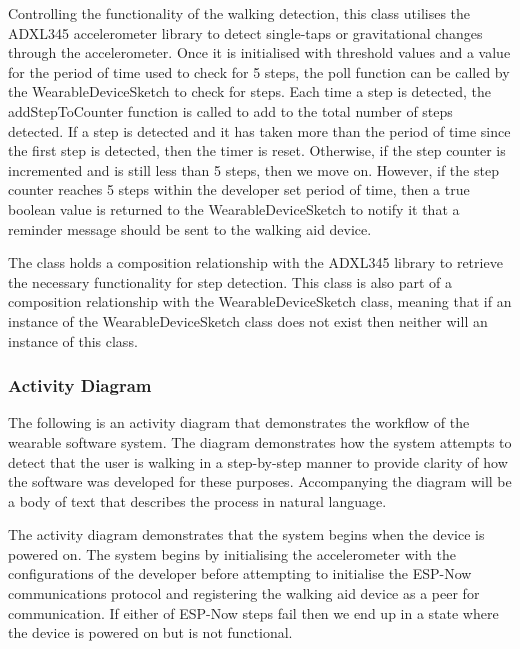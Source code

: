                     Controlling the functionality of the walking detection, this class utilises the ADXL345 accelerometer library to detect single-taps or gravitational changes through the accelerometer. Once it is initialised with threshold values and a value for the period of time used to check for 5 steps, the poll function can be called by the WearableDeviceSketch to check for steps. Each time a step is detected, the addStepToCounter function is called to add to the total number of steps detected. If a step is detected and it has taken more than the period of time since the first step is detected, then the timer is reset. Otherwise, if the step counter is incremented and is still less than 5 steps, then we move on. However, if the step counter reaches 5 steps within the developer set period of time, then a true boolean value is returned to the WearableDeviceSketch to notify it that a reminder message should be sent to the walking aid device.

                    The class holds a composition relationship with the ADXL345 library to retrieve the necessary functionality for step detection. This class is also part of a composition relationship with the WearableDeviceSketch class, meaning that if an instance of the WearableDeviceSketch class does not exist then neither will an instance of this class. 

                \newpage

            \subsubsection{Activity Diagram}
            \label{subsubsec:wearable_activity}

                The following is an activity diagram that demonstrates the workflow of the wearable software system. The diagram demonstrates how the system attempts to detect that the user is walking in a step-by-step manner to provide clarity of how the software was developed for these purposes. Accompanying the diagram will be a body of text that describes the process in natural language.

                

                The activity diagram demonstrates that the system begins when the device is powered on. The system begins by initialising the accelerometer with the configurations of the developer before attempting to initialise the ESP-Now communications protocol and registering the walking aid device as a peer for communication. If either of ESP-Now steps fail then we end up in a state where the device is powered on but is not functional. 

